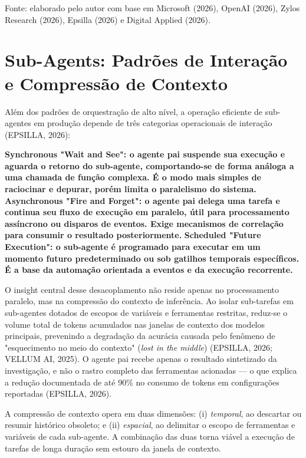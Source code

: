 \documentclass[12pt,a4paper]{article}
\begin{document}
Fonte: elaborado pelo autor com base em Microsoft (2026), OpenAI (2026), Zylos Research (2026), Epsilla (2026) e Digital Applied (2026).


\section{Sub-Agents: Padrões de Interação e Compressão de Contexto}

Além dos padrões de orquestração de alto nível, a operação eficiente de sub-agentes em produção depende de três categorias operacionais de interação (EPSILLA, 2026):

\textbf{\textbf{Synchronous "Wait and See"}: o agente pai suspende sua execução e aguarda o retorno do sub-agente, comportando-se de forma análoga a uma chamada de função complexa. É o modo mais simples de raciocinar e depurar, porém limita o paralelismo do sistema.}
\textbf{\textbf{Asynchronous "Fire and Forget"}: o agente pai delega uma tarefa e continua seu fluxo de execução em paralelo, útil para processamento assíncrono ou disparos de eventos. Exige mecanismos de correlação para consumir o resultado posteriormente.}
\textbf{\textbf{Scheduled "Future Execution"}: o sub-agente é programado para executar em um momento futuro predeterminado ou sob gatilhos temporais específicos. É a base da automação orientada a eventos e da execução recorrente.}

O insight central desse desacoplamento não reside apenas no processamento paralelo, mas na compressão do contexto de inferência. Ao isolar sub-tarefas em sub-agentes dotados de escopos de variáveis e ferramentas restritas, reduz-se o volume total de tokens acumulados nas janelas de contexto dos modelos principais, prevenindo a degradação da acurácia causada pelo fenômeno de "esquecimento no meio do contexto" (\textit{lost in the middle}) (EPSILLA, 2026; VELLUM AI, 2025). O agente pai recebe apenas o resultado sintetizado da investigação, e não o rastro completo das ferramentas acionadas — o que explica a redução documentada de até 90\% no consumo de tokens em configurações reportadas (EPSILLA, 2026).

A compressão de contexto opera em duas dimensões: (i) \textit{temporal}, ao descartar ou resumir histórico obsoleto; e (ii) \textit{espacial}, ao delimitar o escopo de ferramentas e variáveis de cada sub-agente. A combinação das duas torna viável a execução de tarefas de longa duração sem estouro da janela de contexto.
\end{document}
